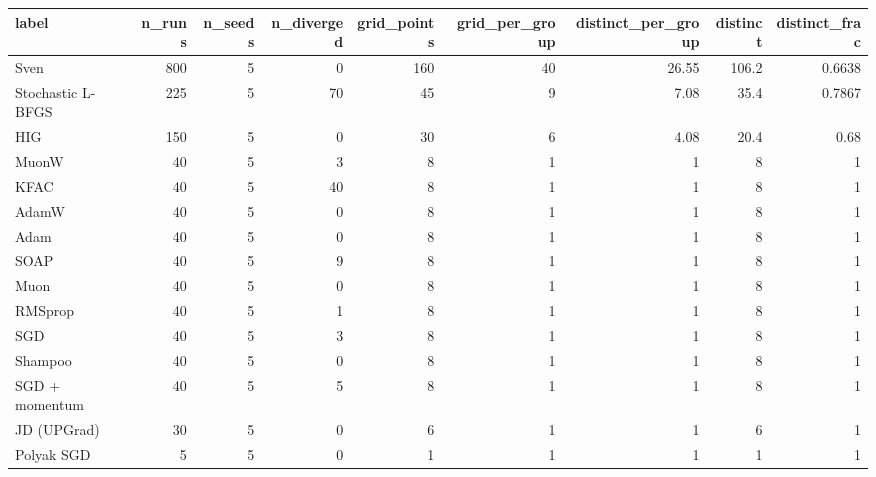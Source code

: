 \begin{tabular}{lrrrrrrrr}
\toprule
label & n\_runs & n\_seeds & n\_diverged & grid\_points & grid\_per\_group & distinct\_per\_group & distinct & distinct\_frac \\
\midrule
Sven & 800 & 5 & 0 & 160 & 40 & 26.55 & 106.2 & 0.6638 \\
Stochastic L-BFGS & 225 & 5 & 70 & 45 & 9 & 7.08 & 35.4 & 0.7867 \\
HIG & 150 & 5 & 0 & 30 & 6 & 4.08 & 20.4 & 0.68 \\
MuonW & 40 & 5 & 3 & 8 & 1 & 1 & 8 & 1 \\
KFAC & 40 & 5 & 40 & 8 & 1 & 1 & 8 & 1 \\
AdamW & 40 & 5 & 0 & 8 & 1 & 1 & 8 & 1 \\
Adam & 40 & 5 & 0 & 8 & 1 & 1 & 8 & 1 \\
SOAP & 40 & 5 & 9 & 8 & 1 & 1 & 8 & 1 \\
Muon & 40 & 5 & 0 & 8 & 1 & 1 & 8 & 1 \\
RMSprop & 40 & 5 & 1 & 8 & 1 & 1 & 8 & 1 \\
SGD & 40 & 5 & 3 & 8 & 1 & 1 & 8 & 1 \\
Shampoo & 40 & 5 & 0 & 8 & 1 & 1 & 8 & 1 \\
SGD + momentum & 40 & 5 & 5 & 8 & 1 & 1 & 8 & 1 \\
JD (UPGrad) & 30 & 5 & 0 & 6 & 1 & 1 & 6 & 1 \\
Polyak SGD & 5 & 5 & 0 & 1 & 1 & 1 & 1 & 1 \\
\bottomrule
\end{tabular}
